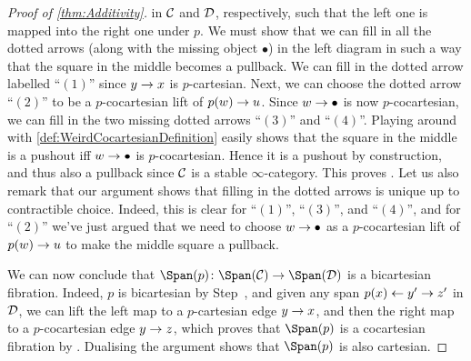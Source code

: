 \documentclass[a4paper, 10pt, oneside, DIV=9, chapterprefix=true, numbers=enddot,bibliography=totoc]{scrbook}
\begin{document}
\begin{proof}[Proof of \cref{thm:Additivity}]
	in $\mathcal{C}$ and $\mathcal{D}$, respectively, such that the left one is mapped into the right one under $p$. We must show that we can fill in all the dotted arrows (along with the missing object $\bullet$) in the left diagram in such a way that the square in the middle becomes a pullback. We can fill in the dotted arrow labelled \enquote{$(1)$} since $y\morphism x$ is $p$-cartesian. Next, we can choose the dotted arrow \enquote{$(2)$} to be a $p$-cocartesian lift of $p(w)\morphism u$. Since $w\morphism \bullet$ is now $p$-cocartesian, we can fill in the two missing dotted arrows \enquote{$(3)$} and \enquote{$(4)$}. Playing around with \cref{def:WeirdCocartesianDefinition} easily shows that the square in the middle is a pushout iff $w\morphism \bullet$ is $p$-cocartesian. Hence it is a pushout by construction, and thus also a pullback since $\mathcal{C}$ is a stable $\infty$-category. This proves \itememph{\boxtimes}. Let us also remark that our argument shows that filling in the dotted arrows is unique up to contractible choice. Indeed, this is clear for \enquote{$(1)$}, \enquote{$(3)$}, and \enquote{$(4)$}, and for \enquote{$(2)$} we've just argued that we need to choose $w\morphism \bullet$ as a $p$-cocartesian lift of $p(w)\morphism u$ to make the middle square a pullback.
	
	We can now conclude that $\Span(p)\colon \Span(\Cc)\morphism \Span(\Dd)$ is a bicartesian fibration. Indeed, $p$ is bicartesian by Step~, and given any span $p(x)\lmorphism y'\morphism z'$ in $\mathcal{D}$, we can lift the left map to a $p$-cartesian edge $y\morphism x$, and then the right map to a $p$-cocartesian edge $y\morphism z$, which proves that $\Span(p)$ is a cocartesian fibration by \itememph{\boxtimes}. Dualising the argument shows that $\Span(p)$ is also cartesian.
	

\end{proof}
\end{document}

